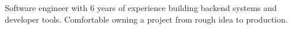Software engineer with 6 years of experience building backend systems and
developer tools. Comfortable owning a project from rough idea to production.
